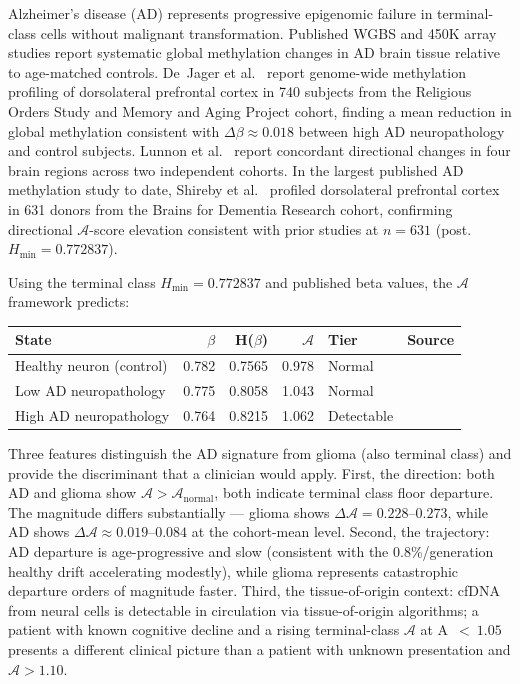 \documentclass[12pt,a4paper]{article}
\newcommand{\Hmin}{H_{\min}}
\newcommand{\Ascore}{\mathcal{A}}
\begin{document}
Alzheimer's disease (AD) represents progressive epigenomic failure in terminal-class
cells without malignant transformation. Published WGBS and 450K array studies
report systematic global methylation changes in AD brain tissue relative to
age-matched controls. De~Jager et al.~\cite{DeJager2014} report genome-wide
methylation profiling of dorsolateral prefrontal cortex in 740 subjects from the
Religious Orders Study and Memory and Aging Project cohort, finding a mean
reduction in global methylation consistent with $\Delta\beta \approx 0.018$
between high AD neuropathology and control subjects. Lunnon et al.~\cite{Lunnon2014}
report concordant directional changes in four brain regions across two independent
cohorts. In the largest published AD methylation study to date, Shireby et al.\
\cite{Shireby2022} profiled dorsolateral prefrontal cortex in 631 donors from the
Brains for Dementia Research cohort, confirming directional $\mathcal{A}$-score
elevation consistent with prior studies at $n = 631$ (post.\ $\Hmin = 0.772837$).

Using the terminal class $\Hmin = 0.772837$ and published beta values, the
$\Ascore$ framework predicts:

\begin{center}
{\small\begin{tabular}{@{}p{3.8cm}rrrp{1.6cm}p{2.8cm}@{}}
\toprule
\textbf{State} & \textbf{$\beta$} & \textbf{H($\beta$)} & \textbf{$\Ascore$} &
\textbf{Tier} & \textbf{Source} \\
\midrule
Healthy neuron (control)   & 0.782 & 0.7565 & 0.978 & Normal &
  \cite{Lister2013} \\
Low AD neuropathology     & 0.775 & 0.8058 & 1.043 & Normal &
  \cite{DeJager2014} \\
High AD neuropathology    & 0.764 & 0.8215 & 1.062 & Detectable &
  \cite{DeJager2014} \\
\bottomrule
\end{tabular}}
\end{center}

Three features distinguish the AD signature from glioma (also terminal class)
and provide the discriminant that a clinician would apply. First, the direction:
both AD and glioma show $\Ascore > \Ascore_{\mathrm{normal}}$, both indicate
terminal class floor departure. The magnitude differs substantially --- glioma
shows $\Delta\Ascore = 0.228$--$0.273$, while AD shows $\Delta\Ascore \approx
0.019$--$0.084$ at the cohort-mean level. Second, the trajectory: AD departure
is age-progressive and slow (consistent with the 0.8\%/generation healthy drift
accelerating modestly), while glioma represents catastrophic departure orders
of magnitude faster. Third, the tissue-of-origin context: cfDNA from neural
cells is detectable in circulation via tissue-of-origin algorithms; a patient
with known cognitive decline and a rising terminal-class $\Ascore$ at A~$<~1.05$
presents a different clinical picture than a patient with unknown presentation
and $\Ascore > 1.10$.
\end{document}
